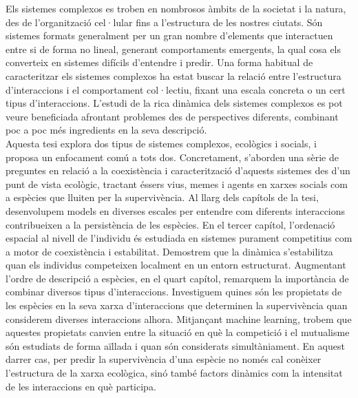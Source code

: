 Els sistemes complexos es troben en nombrosos àmbits de la societat i la natura, des de l'organització cel·lular fins a l'estructura de les nostres ciutats. Són sistemes formats generalment per un gran nombre d'elements que interactuen entre si de forma no lineal, generant comportaments emergents, la qual cosa els converteix en sistemes difícils d'entendre i predir. Una forma habitual de caracteritzar els sistemes complexos ha estat buscar la relació entre l'estructura d'interaccions i el comportament col·lectiu, fixant una escala concreta o un cert tipus d'interaccions. L'estudi de la rica dinàmica dels sistemes complexos es pot veure beneficiada afrontant problemes des de perspectives diferents, combinant poc a poc més ingredients en la seva descripció. \\

Aquesta tesi explora dos tipus de sistemes complexos, ecològics i socials, i proposa un enfocament comú a tots dos. Concretament, s'aborden una sèrie de preguntes en relació a la coexistència i caracterització d'aquests sistemes des d'un punt de vista ecològic, tractant éssers vius, memes i agents en xarxes socials com a espècies que lluiten per la supervivència. Al llarg dels capítols de la tesi, desenvolupem models en diverses escales per entendre com diferents interaccions contribueixen a la persistència de les espècies. En el tercer capítol, l'ordenació espacial al nivell de l'individu és estudiada en sistemes purament competitius com a motor de coexistència i estabilitat. Demostrem que la dinàmica s'estabilitza quan els individus competeixen localment en un entorn estructurat. Augmentant l'ordre de descripció a espècies, en el quart capítol, remarquem la importància de combinar diversos tipus d'interaccions. Investiguem quines són les propietats de les espècies en la seva xarxa d'interaccions que determinen la supervivència quan considerem diverses interaccions alhora. Mitjançant machine learning, trobem que aquestes propietats canvien entre la situació en què la competició i el mutualisme són estudiats de forma aïllada i quan són considerats simultàniament. En aquest darrer cas, per predir la supervivència d'una espècie no només cal conèixer l'estructura de la xarxa ecològica, sinó també factors dinàmics com la intensitat de les interaccions en què participa. \\

